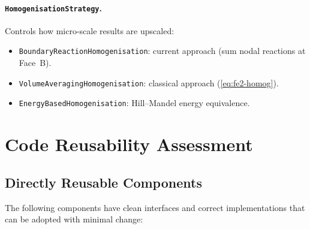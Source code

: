 \paragraph{\texttt{HomogenisationStrategy}.}
Controls how micro-scale results are upscaled:
\begin{itemize}
  \item \texttt{BoundaryReactionHomogenisation}: current approach
    (sum nodal reactions at Face~B).
  \item \texttt{VolumeAveragingHomogenisation}: classical approach
    (\ref{eq:fe2-homog}).
  \item \texttt{EnergyBasedHomogenisation}: Hill--Mandel energy
    equivalence.
\end{itemize}


\section{Code Reusability Assessment}
\label{sec:ms-reuse}

\subsection{Directly Reusable Components}

The following components have clean interfaces and correct
implementations that can be adopted with minimal change:

